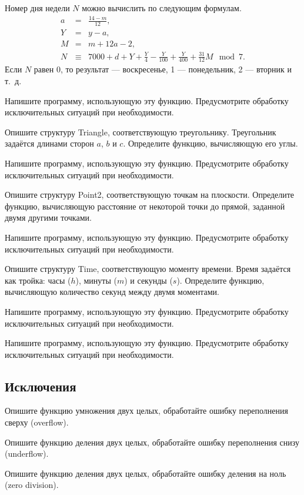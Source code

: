 Номер дня недели $N$ можно вычислить по следующим формулам.
\begin{eqnarray*}
a &=& \frac{14 - m}{12},\\
Y &=& y - a,\\
M &=& m + 12a - 2,\\
N &\equiv& 7000 + d + Y + \frac{Y}{4} - \frac{Y}{100} + \frac{Y}{400} + \frac{31}{12}M \mod 7.
\end{eqnarray*}
Если $N$ равен 0, то результат — воскресенье, 1 — понедельник, 2 —
вторник и т.~д.

Напишите программу, использующую эту функцию. Предусмотрите обработку
исключительных ситуаций при необходимости.

\task Опишите структуру Triangle, соответствующую
треугольнику. Треугольник задаётся длинами сторон $a$, $b$ и $c$.
Определите функцию, вычисляющую его углы.

Напишите программу, использующую эту функцию. Предусмотрите обработку
исключительных ситуаций при необходимости.

\task Опишите структуру Point2, соответствующую точкам на
плоскости. Определите функцию, вычисляющую расстояние от некоторой
точки до прямой, заданной двумя другими точками.

Напишите программу, использующую эту функцию. Предусмотрите обработку
исключительных ситуаций при необходимости.

\task Опишите структуру Time, соответствующую моменту времени. Время
задаётся как тройка: часы ($h$), минуты ($m$) и секунды
($s$). Определите функцию, вычисляющую количество секунд между двумя
моментами.

Напишите программу, использующую эту функцию. Предусмотрите обработку
исключительных ситуаций при необходимости.

\task 

Напишите программу, использующую эту функцию. Предусмотрите обработку
исключительных ситуаций при необходимости.


\subsection{Исключения}

\task Опишите функцию умножения двух целых, обработайте ошибку переполнения сверху (overflow).

\task Опишите функцию деления двух целых, обработайте ошибку переполнения снизу (underflow).

\task Опишите функцию деления двух целых, обработайте ошибку деления на ноль (zero division).

